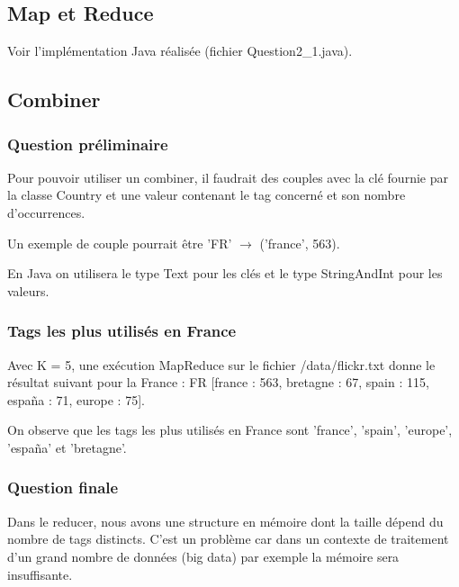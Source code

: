 \documentclass[a4paper, 11pt, titlepage]{article}
\begin{document}
\subsection {Map et Reduce}

Voir l'implémentation Java réalisée (fichier Question2\_1.java).






\subsection {Combiner}

\subsubsection* {Question préliminaire}

Pour pouvoir utiliser un combiner, il faudrait des couples avec la clé fournie par la classe Country et une valeur contenant le tag concerné et son nombre d'occurrences.

Un exemple de couple pourrait être 'FR' $\rightarrow$ ('france', 563).

En Java on utilisera le type Text pour les clés et le type StringAndInt pour les valeurs.


\subsubsection* {Tags les plus utilisés en France}

Avec K = 5, une exécution MapReduce sur le fichier /data/flickr.txt donne le résultat suivant pour la France :
FR  [france : 563, bretagne : 67, spain : 115, españa : 71, europe : 75].

On observe que les tags les plus utilisés en France sont 'france', 'spain', 'europe', 'españa' et 'bretagne'.


\subsubsection* {Question finale}

Dans le reducer, nous avons une structure en mémoire dont la taille dépend du nombre de tags distincts. C'est un problème car dans un contexte de traitement d'un grand nombre de données (big data) par exemple la mémoire sera insuffisante.
\end{document}
